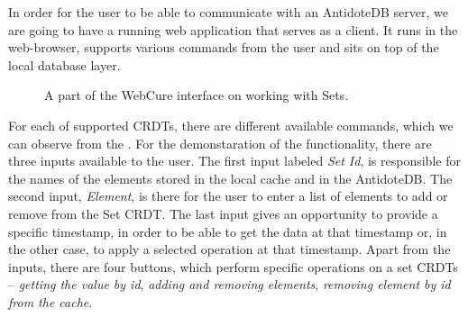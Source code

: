 In order for the user to be able to communicate with an AntidoteDB server, we are going to have a running web application that serves as a client. It runs in the web-browser, supports various commands from the user and sits on top of the local database layer.

\begin{figure}[!htb]
    \begin{center}
    \setlength{\fboxsep}{4pt}%
    \setlength{\fboxrule}{1pt}%
    {\scriptsize}
    \caption {A part of the WebCure interface on working with Sets.}
    \label{fig:dev2}
\end{center}
\end{figure}
 

For each of supported CRDTs, there are different available commands, which we can observe from the . For the demonstaration of the functionality, there are three inputs available to the user. The first input labeled \textit{Set Id}, is responsible for the names of the elements stored in the local cache and in the AntidoteDB. The second input, \textit{Element}, is there for the user to enter a list of elements to add or remove from the Set CRDT. The last input gives an opportunity to provide a specific timestamp, in order to be able to get the data at that timestamp or, in the other case, to apply a selected operation at that timestamp. Apart from the inputs, there are four buttons, which perform specific operations on a set CRDTs -- \textit{getting the value by id}, \textit{adding and removing elements}, \textit{removing element by id from the cache}.

